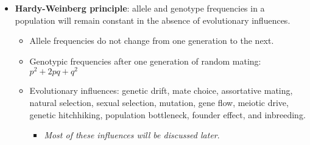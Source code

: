 \documentclass[12pt,a4paper]{article}
\begin{document}
\begin{itemize}
\begin{itemize}
        \end{itemize}
    \item \textbf{Hardy-Weinberg principle}: allele and genotype {\color{o-Sun}frequencies} in a population will remain {\color{o-Sun}constant} in the {\color{o-Sun}absence of evolutionary influences}.
        \begin{itemize}
            \item Allele frequencies do not change from one generation to the next.
            \item Genotypic frequencies after one generation of random mating: \(p^2 + 2pq + q^2\)
            \item Evolutionary influences: genetic drift, mate choice, assortative mating, natural selection, sexual selection, mutation, gene flow, meiotic drive, genetic hitchhiking, population bottleneck, founder effect, and inbreeding.
                \begin{itemize}
                    \item \textit{Most of these influences will be discussed later}.
                \end{itemize}
        \end{itemize}
\end{itemize}
\end{document}
